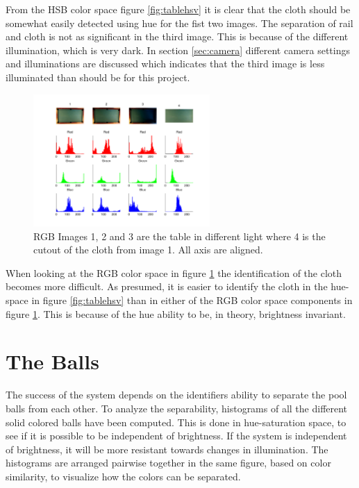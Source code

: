 From the HSB color space figure \ref{fig:tablehsv} it is clear that the cloth should be somewhat easily detected using hue for the fist two images. The separation of rail and cloth is not as significant in the third image. This is because of the different illumination, which is very dark. In section \ref{sec:camera} different camera settings and illuminations are discussed which indicates that the third image is less illuminated than should be for this project.
\begin{figure}[H]
\begin{center}
\leavevmode
\includegraphics[width=0.6\textwidth]{images/rgb_hist_table}
\end{center}
\caption{RGB Images 1, 2 and 3 are the table in different light where 4 is the cutout of the cloth from image 1. All axis are aligned.}
\label{fig:tablergb}
\end{figure}
When looking at the RGB color space in figure \ref{fig:tablergb} the identification of the cloth becomes more difficult. 
As presumed, it is easier to identify the cloth in the hue-space in figure \ref{fig:tablehsv} than in either of the RGB color space components in figure \ref{fig:tablergb}. This is because of the hue ability to be, in theory, brightness invariant.

\section{The Balls}
\label{sec:analballs}
The success of the system depends on the identifiers ability to separate the pool balls from each other. To analyze the separability, histograms of all the different solid colored balls have been computed. This is done in hue-saturation space, to see if it is possible to be independent of brightness. If the system is independent of brightness, it will be more resistant towards changes in illumination. The histograms are arranged pairwise together in the same figure, based on color similarity, to visualize how the colors can be separated.

